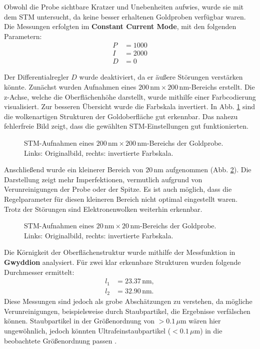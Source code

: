\documentclass{article}
\begin{document}
Obwohl die Probe sichtbare Kratzer und Unebenheiten aufwies, wurde sie mit dem STM untersucht, da keine besser erhaltenen Goldproben verfügbar waren. Die Messungen erfolgten im \textbf{Constant Current Mode}, mit den folgenden Parametern: 
\begin{align*}
    P &= 1000 \\
    I &= 2000 \\
    D &= 0
\end{align*}

Der Differentialregler $D$ wurde deaktiviert, da er äußere Störungen verstärken könnte. Zunächst wurden Aufnahmen eines $200 \, \text{nm} \times 200 \, \text{nm}$-Bereichs erstellt. Die z-Achse, welche die Oberflächenhöhe darstellt, wurde mithilfe einer Farbcodierung visualisiert. Zur besseren Übersicht wurde die Farbskala invertiert. In Abb. \ref{fig:gold-probe} sind die wolkenartigen Strukturen der Goldoberfläche gut erkennbar. Das nahezu fehlerfreie Bild zeigt, dass die gewählten STM-Einstellungen gut funktionierten.

\begin{figure}[h!]
    \centering
    \hfill
    \caption{STM-Aufnahmen eines $200 \, \text{nm} \times 200 \, \text{nm}$-Bereichs der Goldprobe. Links: Originalbild, rechts: invertierte Farbskala.}
    \label{fig:gold-probe}
\end{figure}
Anschließend wurde ein kleinerer Bereich von $20 \, \text{nm}$ aufgenommen (Abb. \ref{fig:gold-probeb}). Die Darstellung zeigt mehr Imperfektionen, vermutlich aufgrund von Verunreinigungen der Probe oder der Spitze. Es ist auch möglich, dass die Regelparameter für diesen kleineren Bereich nicht optimal eingestellt waren. Trotz der Störungen sind Elektronenwolken weiterhin erkennbar.

\begin{figure}[h!]
    \centering
    \hfill
    \caption{STM-Aufnahmen eines $20 \, \text{nm} \times 20 \, \text{nm}$-Bereichs der Goldprobe. Links: Originalbild, rechts: invertierte Farbskala.}
    \label{fig:gold-probeb}
\end{figure}

Die Körnigkeit der Oberflächenstruktur wurde mithilfe der Messfunktion in \textbf{Gwyddion} analysiert. Für zwei klar erkennbare Strukturen wurden folgende Durchmesser ermittelt:
\begin{align*}
    l_1 &= 23.37 \, \text{nm}, \\
    l_2 &= 32.90 \, \text{nm}.
\end{align*}
Diese Messungen sind jedoch als grobe Abschätzungen zu verstehen, da mögliche Verunreinigungen, beispielsweise durch Staubpartikel, die Ergebnisse verfälschen können. Staubpartikel in der Größenordnung von $>0.1 \, \mu\text{m}$ wären hier ungewöhnlich, jedoch könnten Ultrafeinstaubpartikel ($<0.1 \, \mu\text{m}$) in die beobachtete Größenordnung passen \cite{feinstaub}.
\end{document}
